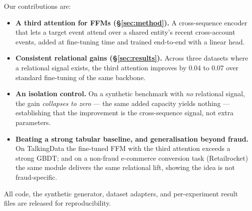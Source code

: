 Our contributions are:
\begin{itemize}
\item \textbf{A third attention for FFMs (\S\ref{sec:method}).} A cross-sequence encoder that lets a
target event attend over a shared entity's recent cross-account events, added at fine-tuning time
and trained end-to-end with a linear head.
\item \textbf{Consistent relational gains (\S\ref{sec:results}).} Across three datasets where a
relational signal exists, the third attention improves \prauc{} by \num{+0.04} to \num{+0.07} over
standard fine-tuning of the same backbone.
\item \textbf{An isolation control.} On a synthetic benchmark with \emph{no} relational signal, the
gain \emph{collapses to zero} --- the same added capacity yields nothing --- establishing that the
improvement is the cross-sequence signal, not extra parameters.
\item \textbf{Beating a strong tabular baseline, and generalisation beyond fraud.} On TalkingData
the fine-tuned FFM with the third attention exceeds a strong GBDT; and on a non-fraud e-commerce
conversion task (Retailrocket) the same module delivers the same relational lift, showing the idea
is not fraud-specific.
\end{itemize}

All code, the synthetic generator, dataset adapters, and per-experiment result files are released for
reproducibility.

